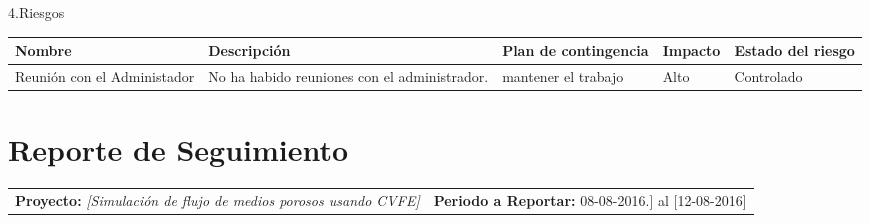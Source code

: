 \documentclass[12pt]{report}
\numberwithin{equation}{section}
\begin{document}
\begin{flushleft}
\begin{table}[H]
\begin{tabular}{|m{0.5cm}|m{0.7cm}|m{2.5cm}|m{3cm}|m{2.5cm}|m{2.5cm}|}
\end{tabular}

\end{table}




\large{4.Riesgos}\\


\begin{table}[H]
\begin{tabular}{|m{2cm}|m{4cm}|m{4.5cm}|m{1.5cm}|m{2cm}|}
\hline 
\textbf{Nombre } & \textbf{Descripci\'on} & \textbf{Plan de contingencia} & \textbf{Impacto} & \textbf{Estado del riesgo}  \\
\hline
\hline
\small{Reuni\'on con el Administador} & \small{No ha habido reuniones con el administrador.}& \small{mantener el trabajo}  & \small{Alto} & \small{Controlado}\\
\hline
\end{tabular}
\label{tabla: TABLA CE de nuevos riesgos}
\end{table}

\end{flushleft}

\newpage

\centering \section{Reporte de Seguimiento} 


\begin{tabular}{m{7cm} m{8cm}}
\small{ \textbf{Proyecto:} \scriptsize{\textit{[Simulaci\'on de flujo de medios porosos usando CVFE]}}} & \small{\textbf{Periodo a Reportar:} \scriptsize{08-08-2016.] al [12-08-2016]}}
\end{tabular}
\end{document}
